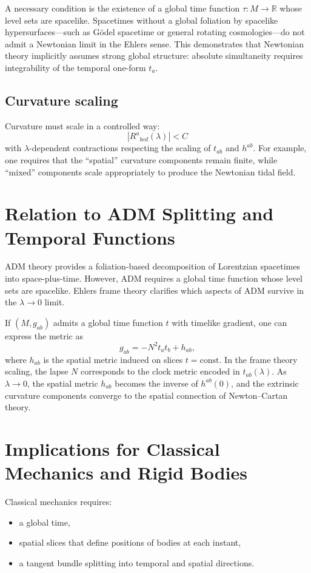 \documentclass[12pt]{article}
\begin{document}
A necessary condition is the existence of a global time function 
$\tau: M \to \mathbb{R}$ whose level sets are spacelike.
Spacetimes without a global foliation by spacelike hypersurfaces—such as Gödel
spacetime or general rotating cosmologies—do not admit a Newtonian limit in the
Ehlers sense.
This demonstrates that Newtonian theory implicitly assumes strong global
structure: absolute simultaneity requires integrability of the temporal 
one-form $t_a$.

\subsection{Curvature scaling}

Curvature must scale in a controlled way:
\[
|R^a{}_{bcd}(\lambda)| < C
\]
with $\lambda$-dependent contractions respecting the scaling of $t_{ab}$ and
$h^{ab}$.
For example, one requires that the ``spatial'' curvature components remain
finite, while ``mixed'' components scale appropriately to produce the
Newtonian tidal field.

\section{Relation to ADM Splitting and Temporal Functions}

ADM theory provides a foliation-based decomposition of Lorentzian spacetimes
into space-plus-time.
However, ADM requires a global time function whose level sets are spacelike.
Ehlers frame theory clarifies which aspects of ADM survive in the 
$\lambda\to 0$ limit.

If $(M,g_{ab})$ admits a global time function $t$ with timelike gradient, one
can express the metric as
\[
g_{ab} = -N^2 t_a t_b + h_{ab},
\]
where $h_{ab}$ is the spatial metric induced on slices $t=\mathrm{const}$.
In the frame theory scaling, the lapse $N$ corresponds to the clock metric
encoded in $t_{ab}(\lambda)$.
As $\lambda\to 0$, the spatial metric $h_{ab}$ becomes the inverse of
$h^{ab}(0)$, and the extrinsic curvature components converge to the spatial
connection of Newton--Cartan theory.

\section{Implications for Classical Mechanics and Rigid Bodies}

Classical mechanics requires:
\begin{itemize}
\item a global time,
\item spatial slices that define positions of bodies at each instant,
\item a tangent bundle splitting into temporal and spatial directions.
\end{itemize}
\end{document}
